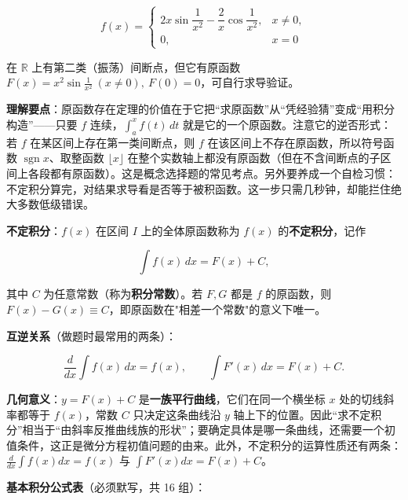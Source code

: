 \documentclass[11pt,openany,UTF8]{ctexbook}
\begin{document}
\[f(x)=\begin{cases}2x\sin\dfrac{1}{x^2}-\dfrac{2}{x}\cos\dfrac{1}{x^2}, & x\neq 0,\\[2mm] 0, & x=0\end{cases}\]

在 $\mathbb{R}$ 上有第二类（振荡）间断点，但它有原函数 $F(x)=x^2\sin\frac{1}{x^2}\ (x\neq 0),\ F(0)=0$，可自行求导验证。

\textbf{理解要点}：原函数存在定理的价值在于它把“求原函数”从“凭经验猜”变成“用积分构造”——只要 $f$ 连续，$\int_a^{x}f(t)\,dt$ 就是它的一个原函数。注意它的逆否形式：若 $f$ 在某区间上存在第一类间断点，则 $f$ 在该区间上不存在原函数，所以符号函数 $\operatorname{sgn}x$、取整函数 $\lfloor x\rfloor$ 在整个实数轴上都没有原函数（但在不含间断点的子区间上各段都有原函数）。这是概念选择题的常见考点。另外要养成一个自检习惯：不定积分算完，对结果求导看是否等于被积函数。这一步只需几秒钟，却能拦住绝大多数低级错误。

\textbf{不定积分}：$f(x)$ 在区间 $I$ 上的全体原函数称为 $f(x)$ 的\textbf{不定积分}，记作

\[\int f(x)\,dx=F(x)+C,\]

其中 $C$ 为任意常数（称为\textbf{积分常数}）。若 $F,G$ 都是 $f$ 的原函数，则 $F(x)-G(x)\equiv C$，即原函数在"相差一个常数"的意义下唯一。

\textbf{互逆关系}（做题时最常用的两条）：

\[\frac{d}{dx}\int f(x)\,dx=f(x),\qquad \int F'(x)\,dx=F(x)+C.\]

\textbf{几何意义}：$y=F(x)+C$ 是\textbf{一族平行曲线}，它们在同一个横坐标 $x$ 处的切线斜率都等于 $f(x)$，常数 $C$ 只决定这条曲线沿 $y$ 轴上下的位置。因此“求不定积分”相当于“由斜率反推曲线族的形状”；要确定具体是哪一条曲线，还需要一个初值条件，这正是微分方程初值问题的由来。此外，不定积分的运算性质还有两条：$\frac{d}{dx}\int f(x)dx=f(x)$ 与 $\int F'(x)dx=F(x)+C$。

\textbf{基本积分公式表}（必须默写，共 16 组）：
\end{document}
